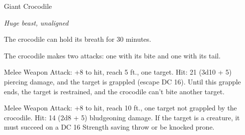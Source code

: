 \begin{monsterbox}{Giant Crocodile}
\begin{hangingpar}
\textit{Huge beast, unaligned}
\end{hangingpar}
\dndline%
\basics[%
armorclass = 14,
hitpoints = 9d12 + 27,
speed = {30 ft., swim 50 ft.}
]
\dndline%
\stats[%
STR = \stat{21},
DEX = \stat{9},
CON = \stat{17},
INT = \stat{2},
WIS = \stat{10},
CHA = \stat{7}
]
\dndline%
\details[%
skills={Stealth +5, },
damageimmunities={},
savingthrows={},
conditionimmunities={},
damageresistances={},
damagevulnerabilities={},
senses={passive Perception 10},
challenge=5
]
\dndline%
\begin{monsteraction}
The crocodile can hold its breath for 30 minutes.
\end{monsteraction}
\begin{monsteraction}[Multiattack]
The crocodile makes two attacks: one with its bite and one with its tail.
\end{monsteraction}
\begin{monsteraction}[Bite]
Melee Weapon Attack: +8 to hit, reach 5 ft., one target. Hit: 21 (3d10 + 5) piercing damage, and the target is grappled (escape DC 16). Until this grapple ends, the target is restrained, and the crocodile can't bite another target.
\end{monsteraction}
\begin{monsteraction}[Tail]
Melee Weapon Attack: +8 to hit, reach 10 ft., one target not grappled by the crocodile. Hit: 14 (2d8 + 5) bludgeoning damage. If the target is a creature, it must succeed on a DC 16 Strength saving throw or be knocked prone.
\end{monsteraction}
\end{monsterbox}